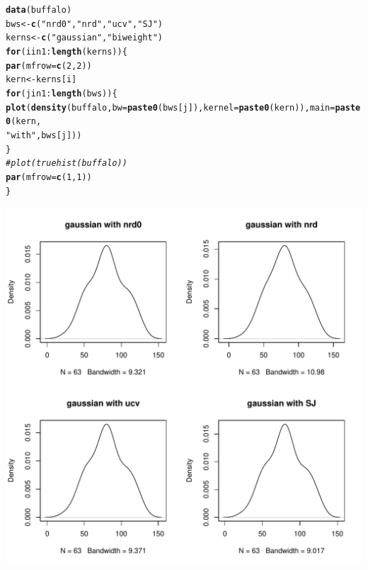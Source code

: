 \documentclass{article}\usepackage[]{graphicx}\usepackage[]{color}
\makeatletter
\def\maxwidth{ %
  \ifdim\Gin@nat@width>\linewidth
    \linewidth
  \else
    \Gin@nat@width
  \fi
}
\newcommand{\hlstr}[1]{\textcolor[rgb]{0.192,0.494,0.8}{#1}}%
\newcommand{\hlcom}[1]{\textcolor[rgb]{0.678,0.584,0.686}{\textit{#1}}}%
\newcommand{\hlkwd}[1]{\textcolor[rgb]{0.737,0.353,0.396}{\textbf{#1}}}%
\newenvironment{kframe}{%
 \def\at@end@of@kframe{}%
 \ifinner\ifhmode%
  \def\at@end@of@kframe{\end{minipage}}%
  \begin{minipage}{\columnwidth}%
 \fi\fi%
 \def\FrameCommand##1{\hskip\@totalleftmargin \hskip-\fboxsep
 \colorbox{shadecolor}{##1}\hskip-\fboxsep
     \hskip-\linewidth \hskip-\@totalleftmargin \hskip\columnwidth}%
 \MakeFramed {\advance\hsize-\width
   \@totalleftmargin\z@ \linewidth\hsize
   \@setminipage}}%
 {\par\unskip\endMakeFramed%
 \at@end@of@kframe}
\newenvironment{knitrout}{}{} %
\makeatother
\begin{document}
\begin{itemize}
\begin{knitrout}
\begin{kframe}
{\ttfamily\noindent\itshape\color{messagecolor}{\#\# Loading required package: gss}}\begin{alltt}
\hlkwd{data}(buffalo)
bws <- \hlkwd{c}(\hlstr{"nrd0"}, \hlstr{"nrd"}, \hlstr{"ucv"}, \hlstr{"SJ"})
kerns <- \hlkwd{c}(\hlstr{"gaussian"}, \hlstr{"biweight"})
\hlkwd{for} (i in 1:\hlkwd{length}(kerns)) \{
    \hlkwd{par}(mfrow = \hlkwd{c}(2, 2))
    kern <- kerns[i]
    \hlkwd{for} (j in 1:\hlkwd{length}(bws)) \{
        \hlkwd{plot}(\hlkwd{density}(buffalo, bw = \hlkwd{paste0}(bws[j]), kernel = \hlkwd{paste0}(kern)), main = \hlkwd{paste0}(kern, 
            \hlstr{" with "}, bws[j]))
    \}
\hlcom{    # plot(truehist(buffalo))}
    \hlkwd{par}(mfrow = \hlkwd{c}(1, 1))
\}
\end{alltt}
\end{kframe}
\includegraphics[width=\maxwidth]{figure/ten81} 


\end{knitrout}
\end{itemize}
\end{document}
